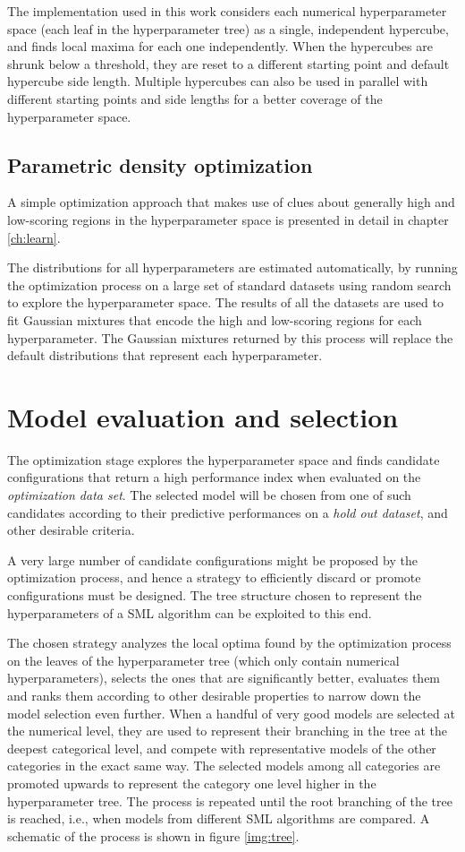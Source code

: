 The implementation used in this work considers each numerical hyperparameter space (each leaf in the
hyperparameter tree) as a single, independent hypercube, and finds local maxima for each one
independently. When the hypercubes are shrunk below a threshold, they are reset to a different
starting point and default hypercube side length. Multiple hypercubes can also be used
in parallel with different starting points and side lengths for a better coverage of the
hyperparameter space.

\subsection{Parametric density optimization}
A simple optimization approach that makes use of clues about generally high and low-scoring regions in the
hyperparameter space is presented in detail in chapter \ref{ch:learn}.

The distributions for all hyperparameters are estimated automatically, by running the optimization
process on a large set of standard datasets using random search to explore the hyperparameter space.
The results of all the datasets are used to fit Gaussian mixtures that encode the high and
low-scoring regions for each hyperparameter. The Gaussian mixtures returned by this process will replace
the default distributions that represent each hyperparameter.

\section{Model evaluation and selection}
The optimization stage explores the hyperparameter space and finds candidate configurations that
return a high performance index when evaluated on the \emph{optimization data set}. The selected
model will be chosen from one of such candidates according to their predictive performances on a
\emph{hold out dataset}, and other desirable criteria.

A very large number of candidate configurations might be proposed by the optimization process, and
hence a strategy to efficiently discard or promote configurations must be designed. 
The tree structure chosen to represent the hyperparameters of a SML algorithm can be exploited to
this end.

The chosen strategy analyzes the local optima found by the optimization process on the leaves of the
hyperparameter tree (which only contain numerical hyperparameters), selects the ones that are
significantly better, evaluates them and ranks them according to other desirable properties to
narrow down the model selection even further. When a handful of very good models are selected at the
numerical level, they are used to represent their branching in the tree at the deepest categorical
level, and compete with representative models of the other categories in the exact same way. The selected
models among all categories are promoted upwards to represent the category one level higher in the
hyperparameter tree. The process is repeated until the root branching of the tree is reached, i.e.,
when models from different SML algorithms are compared. A schematic of the process is shown in
figure \ref{img:tree}.

